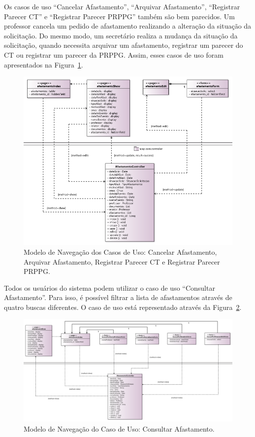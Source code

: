 Os casos de uso ``Cancelar Afastamento'', ``Arquivar Afastamento'', ``Registrar Parecer CT'' e ``Registrar Parecer PRPPG'' também são bem parecidos. Um professor cancela um pedido de afastamento realizando a alteração da situação da solicitação. Do mesmo modo, um secretário realiza a mudança da situação da solicitação, quando necessita arquivar um afastamento, registrar um parecer do CT ou registrar um parecer da PRPPG. Assim, esses casos de uso foram apresentados na Figura~\ref{fig-projeto-cancelar_arquivar_CT_PRPPG}.   

\begin{figure}[!h]
	\centering
	\includegraphics[width=1\textwidth]{figuras/fig-projeto-cancelar_arquivar_CT_PRPPG.png}
	\caption{Modelo de Navegação dos Casos de Uso: Cancelar Afastamento, Arquivar Afastamento, Registrar Parecer CT e Registrar Parecer PRPPG.}
	\label{fig-projeto-cancelar_arquivar_CT_PRPPG}
\end{figure}

Todos os usuários do sistema podem utilizar o caso de uso ``Consultar Afastamento''. Para isso, é possível filtrar a lista de afastamentos através de quatro buscas diferentes. O caso de uso está representado através da Figura~\ref{fig-projeto-consultarAfastamento}.

\begin{figure}[!h]
	\centering
	\includegraphics[width=1\textwidth]{figuras/fig-projeto-consultarAfastamento.png}
	\caption{Modelo de Navegação do Caso de Uso: Consultar Afastamento.}
	\label{fig-projeto-consultarAfastamento}
\end{figure}

